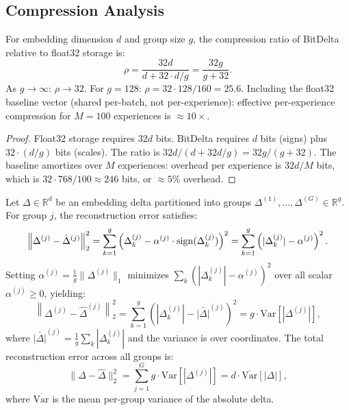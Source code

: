 \subsection{Compression Analysis}

\begin{proposition}
\label{prop:compression}
For embedding dimension $d$ and group size $g$, the compression ratio of
BitDelta relative to float32 storage is:
\begin{equation}
    \rho = \frac{32d}{d + 32 \cdot d/g} = \frac{32g}{g + 32}.
    \label{eq:compression-ratio}
\end{equation}
As $g \to \infty$: $\rho \to 32$. For $g = 128$: $\rho = 32 \cdot 128 / 160 = 25.6$.
Including the float32 baseline vector (shared per-batch, not per-experience):
effective per-experience compression for $M = 100$ experiences is ${\approx}10\times$.
\end{proposition}

\begin{proof}
Float32 storage requires $32d$ bits. BitDelta requires $d$ bits (signs) plus
$32 \cdot (d/g)$ bits (scales). The ratio is $32d / (d + 32d/g) = 32g/(g+32)$.
The baseline amortizes over $M$ experiences: overhead per experience is $32d / M$
bits, which is $32 \cdot 768 / 100 \approx 246$ bits, or ${\approx}5\%$ overhead.
\end{proof}

\begin{theorem}
\label{thm:reconstruction}
Let $\Delta \in \mathbb{R}^d$ be an embedding delta partitioned into groups
$\Delta^{(1)}, \ldots, \Delta^{(G)} \in \mathbb{R}^g$. For group $j$, the
reconstruction error satisfies:
\begin{equation}
    \left\|\Delta^{(j)} - \hat{\Delta}^{(j)}\right\|_2^2
    = \sum_{k=1}^{g} \left(\Delta_k^{(j)} - \alpha^{(j)} \cdot \operatorname{sign}(\Delta_k^{(j)})\right)^2
    = \sum_{k=1}^{g} \left(|\Delta_k^{(j)}| - \alpha^{(j)}\right)^2.
    \label{eq:group-error}
\end{equation}
Setting $\alpha^{(j)} = \frac{1}{g}\|\Delta^{(j)}\|_1$ minimizes
$\sum_k (|\Delta_k^{(j)}| - \alpha^{(j)})^2$ over all scalar $\alpha^{(j)} \geq 0$,
yielding:
\begin{equation}
    \left\|\Delta^{(j)} - \hat{\Delta}^{(j)}\right\|_2^2
    = \sum_{k=1}^{g} \left(|\Delta_k^{(j)}| - \bar{|\Delta|}^{(j)}\right)^2
    = g \cdot \mathrm{Var}\!\left[|\Delta^{(j)}|\right],
    \label{eq:var-error}
\end{equation}
where $\bar{|\Delta|}^{(j)} = \frac{1}{g}\sum_k |\Delta_k^{(j)}|$ and the variance
is over coordinates. The total reconstruction error across all groups is:
\begin{equation}
    \|\Delta - \hat{\Delta}\|_2^2 = \sum_{j=1}^{G} g \cdot \mathrm{Var}\!\left[|\Delta^{(j)}|\right]
    = d \cdot \overline{\mathrm{Var}}\!\left[|\Delta|\right],
\end{equation}
where $\overline{\mathrm{Var}}$ is the mean per-group variance of the absolute delta.
\end{theorem}

